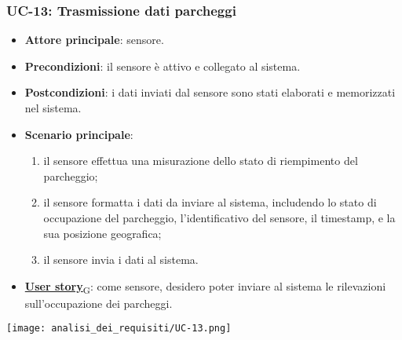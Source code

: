 \subsubsection{UC-13: Trasmissione dati parcheggi}
\begin{itemize}
	\item \textbf{Attore principale}: sensore.
	\item \textbf{Precondizioni}: il sensore è attivo e collegato al sistema.
	\item \textbf{Postcondizioni}: i dati inviati dal sensore sono stati elaborati e memorizzati nel sistema.
	\item \textbf{Scenario principale}:
	      \begin{enumerate}
		      \item il sensore effettua una misurazione dello stato di riempimento del parcheggio;
		      \item il sensore formatta i dati da inviare al sistema, includendo lo stato di occupazione del parcheggio, l'identificativo del sensore,
		            il timestamp, e la sua posizione geografica;
		      \item il sensore invia i dati al sistema.
	      \end{enumerate}
	\item \href{https://7last.github.io/docs/pb/documentazione-interna/glossario\#user-story}{\textbf{User story}\textsubscript{G}}:
	      come sensore, desidero poter inviare al sistema le rilevazioni sull'occupazione dei parcheggi.
\end{itemize}

\begin{center}
	\texttt{[image: analisi\_dei\_requisiti/UC-13.png]}
\end{center}

